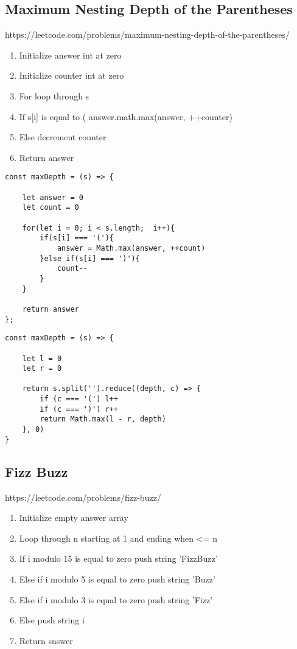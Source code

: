 \documentclass[10pt]{article}
\begin{document}
\pagebreak %
\medskip 
\subsection{Maximum Nesting Depth of the Parentheses}
https://leetcode.com/problems/maximum-nesting-depth-of-the-parentheses/

\begin{enumerate}
	\item Initialize answer int at zero
	\item Initialize counter int at zero
	\item For loop through s
	\item If s[i] is equal to ( answer.math.max(answer, ++counter)
	\item Else decrement counter
	\item Return answer
\end{enumerate}

\begin{lstlisting}[title=Solution maxDepth, captionpos=t]
const maxDepth = (s) => {

    let answer = 0
    let count = 0
    
    for(let i = 0; i < s.length;  i++){
        if(s[i] === '('){
            answer = Math.max(answer, ++count)
        }else if(s[i] === ')'){
            count--
        }  
    }
    
    return answer
};
\end{lstlisting}

\begin{lstlisting}[title=Solution maxDepth with split() and reduce(), captionpos=t]
const maxDepth = (s) => {

    let l = 0
    let r = 0
    
    return s.split('').reduce((depth, c) => {
        if (c === '(') l++
        if (c === ')') r++
        return Math.max(l - r, depth)
    }, 0)
}
\end{lstlisting}
\medskip %





\pagebreak %
\medskip 
\subsection{Fizz Buzz}
https://leetcode.com/problems/fizz-buzz/

\begin{enumerate}
	\item Initialize empty answer array
	\item Loop through n starting at 1 and ending when <= n
	\item If i  modulo 15 is equal to zero push string 'FizzBuzz'
	\item Else if i  modulo 5 is equal to zero push string 'Buzz'
	\item Else if i  modulo 3 is equal to zero push string 'Fizz'
	\item Else push string i 
	\item Return snswer 
\end{enumerate}
\end{document}
